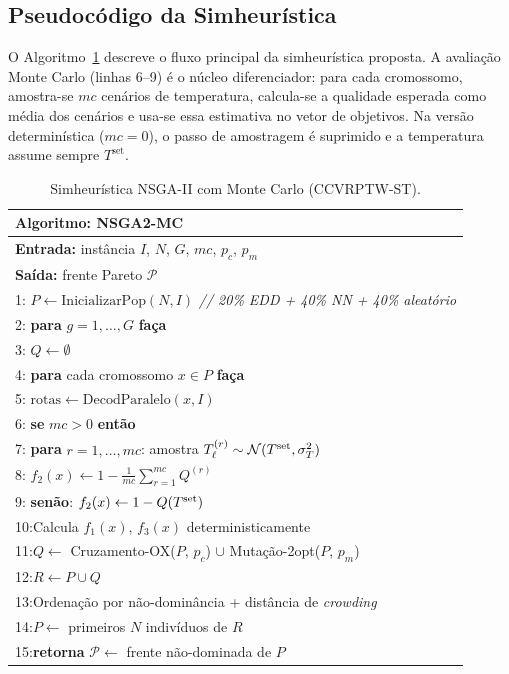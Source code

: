 \documentclass[a4paper,11pt]{article}
\begin{document}
\subsection{Pseudocódigo da Simheurística}

O Algoritmo~\ref{alg:nsga2mc} descreve o fluxo principal da simheurística
proposta.
A avaliação Monte Carlo (linhas 6--9) é o núcleo diferenciador:
para cada cromossomo, amostra-se $mc$ cenários de temperatura,
calcula-se a qualidade esperada como média dos cenários e usa-se essa
estimativa no vetor de objetivos.
Na versão determinística ($mc=0$), o passo de amostragem é suprimido e
a temperatura assume sempre $T^{\mathrm{set}}$.

\begin{table}[ht]
\centering
\caption{Simheurística NSGA-II com Monte Carlo (CCVRPTW-ST).}
\label{alg:nsga2mc}
\small
\begin{tabular}{l}
\toprule
\textbf{Algoritmo:} NSGA2-MC \\
\midrule
\textbf{Entrada:} inst\^ancia $I$, $N$, $G$, $mc$, $p_c$, $p_m$ \\
\textbf{Saída:} frente Pareto $\mathcal{P}$ \\[3pt]
1: $P \leftarrow \text{InicializarPop}(N, I)$ \quad\textit{// 20\% EDD + 40\% NN + 40\% aleatório} \\
2: \textbf{para} $g = 1, \ldots, G$ \textbf{faça} \\
3: \quad $Q \leftarrow \emptyset$ \\
4: \quad \textbf{para} cada cromossomo $x \in P$ \textbf{faça} \\
5: \quad\quad $\text{rotas} \leftarrow \text{DecodParalelo}(x, I)$ \\
6: \quad\quad \textbf{se} $mc > 0$ \textbf{então} \\
7: \quad\quad\quad \textbf{para} $r = 1,\ldots,mc$: amostra $T_\ell^{(r)} \sim \mathcal{N}(T^{\rm set}, \sigma_T^2)$ \\
8: \quad\quad\quad $f_2(x) \leftarrow 1 - \frac{1}{mc}\sum_{r=1}^{mc} Q^{(r)}$ \\
9: \quad\quad \textbf{senão}: $f_2(x) \leftarrow 1 - Q(T^{\rm set})$ \\
10:\quad\quad Calcula $f_1(x)$, $f_3(x)$ deterministicamente \\
11:\quad $Q \leftarrow$ Cruzamento-OX($P$, $p_c$) $\cup$ Mutação-2opt($P$, $p_m$) \\
12:\quad $R \leftarrow P \cup Q$ \\
13:\quad Ordenação por não-domin\^ancia + dist\^ancia de \textit{crowding} \\
14:\quad $P \leftarrow$ primeiros $N$ indivíduos de $R$ \\
15:\textbf{retorna} $\mathcal{P} \leftarrow$ frente não-dominada de $P$ \\
\bottomrule
\end{tabular}
\end{table}
\end{document}
